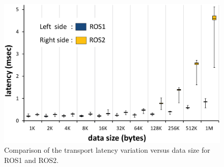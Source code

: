 \documentclass{sig-alternate-ipsn13}
\begin{document}

\begin{figure}[t]
\begin{center}
\includegraphics[scale=0.33]{graph.eps}
\end{center}
\vspace{-8.mm}
\caption{Comparison of the transport latency variation versus data size for ROS1 and ROS2.}
\vspace{-5.0mm}
\label{fig:graph}
\end{figure}



%
\vspace{-3.0mm}



%
%


\end{document}
